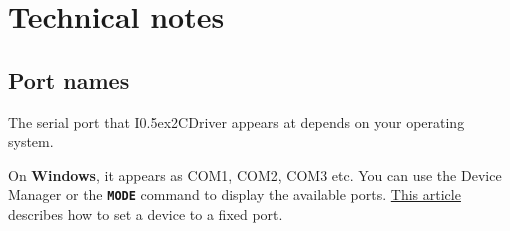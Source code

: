 \documentclass{article}
\newcommand{\two}{\raise0.5ex\hbox{\footnotesize{2}}}
\newcommand{\iicdriver}{I\two{}CDriver}
\newcommand{\mach}[1]{\texttt{\textbf{#1}}}
\begin{document}
% 
% 
% 
% 
% 
% 
% 
% 
% 
% 
% 
% 
\newpage
\section{Technical notes}

\subsection{Port names}

The serial port that \iicdriver{} appears at depends on your operating system.

On \textbf{Windows}, it appears as COM1, COM2, COM3 etc.
You can use the Device Manager or the \mach{MODE} command to display the available ports.
\href{https://plugable.com/2011/07/04/how-to-change-the-com-port-for-a-usb-serial-adapter-on-windows-7/}{This article}
describes how to set a device to a fixed port.
\end{document}
